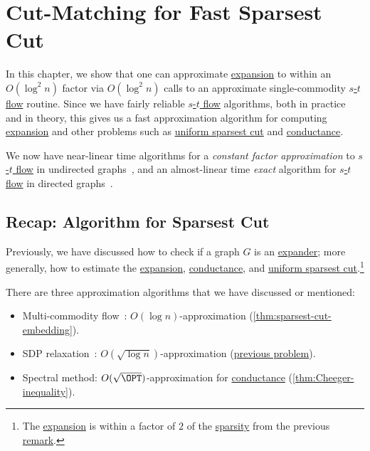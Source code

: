 \chapter{Cut-Matching for Fast Sparsest Cut}
In this chapter, we show that one can approximate \hyperref[def:expansion]{expansion} to within an \(O(\log ^2 n)\) factor via \(O(\log ^2 n)\) calls to an approximate single-commodity \hyperref[prb:s-t-max-flow]{\(s\)-\(t\) flow} routine. Since we have fairly reliable \hyperref[prb:s-t-max-flow]{\(s\)-\(t\) flow} algorithms, both in practice and in theory, this gives us a fast approximation algorithm for computing \hyperref[def:expansion]{expansion} and other problems such as \hyperref[prb:sparsest-cut]{uniform sparsest cut} and \hyperref[def:conductance]{conductance}.

\begin{note}
	We now have near-linear time algorithms for a \emph{constant factor approximation} to \hyperref[prb:s-t-max-flow]{\(s\)-\(t\) flow} in undirected graphs~\cite{peng2016approximate}, and an almost-linear time \emph{exact} algorithm for \hyperref[prb:s-t-max-flow]{\(s\)-\(t\) flow} in directed graphs~\cite{chen2022maximum}.
\end{note}

\section{Recap: Algorithm for Sparsest Cut}
Previously, we have discussed how to check if a graph \(G\) is an \hyperref[def:expander]{expander}; more generally, how to estimate the \hyperref[def:expansion]{expansion}, \hyperref[def:conductance]{conductance}, and \hyperref[prb:sparsest-cut]{uniform sparsest cut}.\footnote{The \hyperref[def:expansion]{expansion} is within a factor of \(2\) of the \hyperref[def:sparsity]{sparsity} from the previous \hyperref[rmk:expansion-sparsity]{remark}.}

\begin{prev}
	There are three approximation algorithms that we have discussed or mentioned:
	\begin{itemize}
		\item Multi-commodity flow~\cite{leighton1999multicommodity}: \(O(\log n)\)-approximation (\autoref{thm:sparsest-cut-embedding}).
		\item SDP relaxation~\cite{arora2009expander}: \(O(\sqrt{\log n} )\)-approximation (\hyperref[prb:SDP-sparsest-cut]{previous problem}).
		\item Spectral method: \(O(\sqrt{\OPT} )\)-approximation for \hyperref[def:conductance]{conductance} (\autoref{thm:Cheeger-inequality}).
	\end{itemize}
\end{prev}

